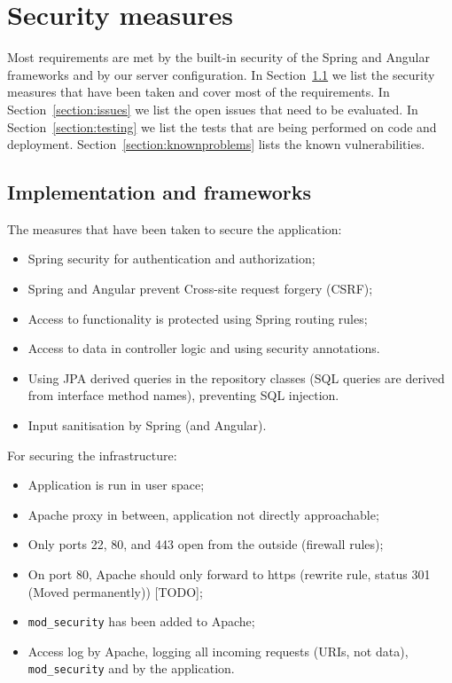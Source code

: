 \documentclass[a4paper]{report}
\begin{document}
\chapter{Security measures}\label{chapter:measures}

Most requirements are met by the built-in security of the Spring and Angular
frameworks and by our server configuration. 
In Section~\ref{section:implementation} we list the security measures that have been
taken and cover most of the requirements. 
In Section~\ref{section:issues} we list the open issues that need to be evaluated.
In Section~\ref{section:testing} we list the tests that are being performed on
code and deployment.
Section~\ref{section:knownproblems} lists the known vulnerabilities.


\section{Implementation and frameworks}\label{section:implementation}

The measures that have been taken to secure the application:
\begin{itemize}
\item Spring security for authentication and authorization;
\item Spring and Angular prevent Cross-site request forgery (CSRF);
\item Access to functionality is protected using Spring routing rules;
\item Access to data in controller logic and using security annotations.
\item Using JPA derived queries in the repository classes 
(SQL queries are derived from interface method names), preventing SQL injection.
\item Input sanitisation by Spring (and Angular).
\end{itemize}

For securing the infrastructure:
\begin{itemize}
\item Application is run in user space;
\item Apache proxy in between, application not directly approachable;
\item Only ports 22, 80, and 443 open from the outside (firewall rules);
\item On port 80, Apache should only forward to https (rewrite rule, 
status 301 (Moved permanently)) [TODO];
\item \texttt{mod\_security} has been added to Apache;
\item Access log by Apache, logging all incoming requests (URIs, not data),
\texttt{mod\_security} and by the application.
\end{itemize}
\end{document}
